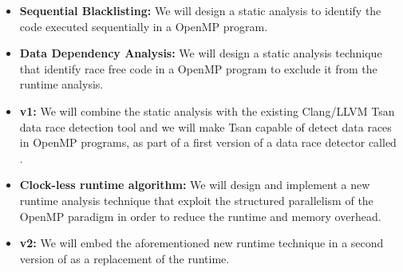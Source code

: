 \begin{itemize}
\item \textbf{Sequential Blacklisting:} We will design a static analysis to
  identify the code executed sequentially in a OpenMP program.
\item \textbf{Data Dependency Analysis:} We will design a static analysis
  technique that identify race free code in a OpenMP program to exclude it
  from the runtime analysis.
\item \textbf{\archer v1:} We will combine the static analysis with the
  existing Clang/LLVM Tsan data race detection tool and we will make Tsan
  capable of detect data races in OpenMP programs, as part of a first version
  of a data race detector called \archer.
\item \textbf{Clock-less runtime algorithm:} We will design and implement a
  new runtime analysis technique that exploit the structured parallelism of
  the OpenMP paradigm in order to reduce the runtime and memory overhead.
\item \textbf{\archer v2:} We will embed the aforementioned new runtime
  technique in a second version of \archer as a replacement of the \tsan
  runtime.
\end{itemize}

